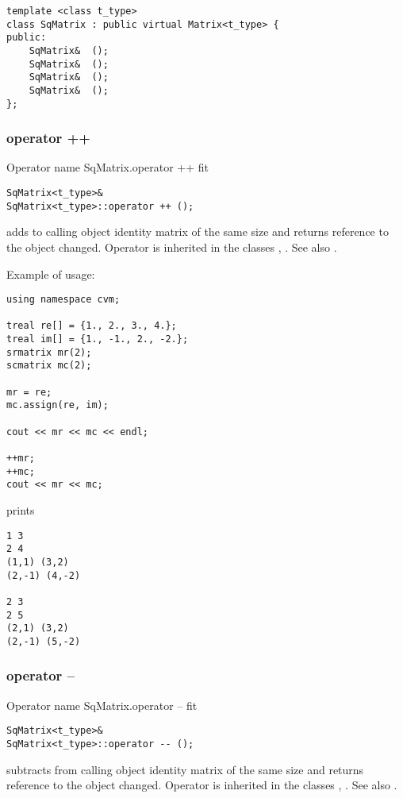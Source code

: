 \bigskip
\noindent
\verb"template <class t_type>"\\
\verb"class SqMatrix : public virtual Matrix<t_type> {"\\
\verb"public:"\\
\verb"    SqMatrix& "\verb" ();"\\
\verb"    SqMatrix& "\verb" ();"\\
\verb"    SqMatrix& "\verb" ();"\\
\verb"    SqMatrix& "\verb" ();"\\
\verb"};"
\newpage




\subsubsection{operator ++}
Operator%
\pdfdest name {SqMatrix.operator ++} fit
\begin{verbatim}
SqMatrix<t_type>&
SqMatrix<t_type>::operator ++ ();
\end{verbatim}
adds to  calling object identity matrix of the same size
and returns reference to
the object changed.
Operator is inherited in the classes
, .
See also .

Example of usage:
\begin{verbatim}
using namespace cvm;

treal re[] = {1., 2., 3., 4.};
treal im[] = {1., -1., 2., -2.};
srmatrix mr(2);
scmatrix mc(2);

mr = re;
mc.assign(re, im);

cout << mr << mc << endl;

++mr;
++mc;
cout << mr << mc;
\end{verbatim}
prints
\begin{verbatim}
1 3
2 4
(1,1) (3,2)
(2,-1) (4,-2)

2 3
2 5
(2,1) (3,2)
(2,-1) (5,-2)
\end{verbatim}
\newpage



\subsubsection{operator --}
Operator%
\pdfdest name {SqMatrix.operator --} fit
\begin{verbatim}
SqMatrix<t_type>&
SqMatrix<t_type>::operator -- ();
\end{verbatim}
subtracts from  calling object identity matrix of the same size
and returns reference to
the object changed.
Operator is inherited in the classes
, .
See also .

